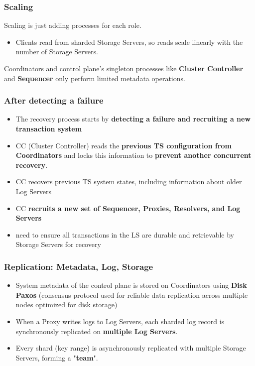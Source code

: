 \begin{frame}
	\frametitle{Scaling}
Scaling is just adding processes for each role. \\

\begin{itemize}
\item Clients read from sharded Storage Servers, so reads scale
linearly with the number of Storage Servers. 
\end{itemize}

\vspace{0.5cm}
Coordinators and control plane's singleton processes like \textbf{Cluster Controller} and \textbf{Sequencer} only perform limited metadata operations.
	
\end{frame}


\begin{frame}
	\frametitle{After detecting a failure}
    \begin{itemize}
        \item The recovery process starts by
        \textbf{detecting a failure and recruiting a new transaction system}
        \item CC (Cluster Controller) reads the \textbf{previous TS configuration from Coordinators} and locks this information
        to \textbf{prevent another concurrent recovery}.
        \item CC recovers previous TS system states, including information about older Log Servers
        \item CC \textbf{recruits a new set of Sequencer, Proxies, Resolvers,
        and Log Servers}
        \item need to ensure all transactions in the LS are durable and retrievable by Storage Servers for recovery

    \end{itemize}

\end{frame}

\begin{frame}
	\frametitle{Replication: Metadata, Log, Storage}
    \begin{itemize}
      \item System metadata of the control plane is stored on Coordinators using \textbf{Disk Paxos} (consensus protocol used for reliable data replication across multiple nodes optimized for disk storage)
      \item When a Proxy writes logs to Log Servers, each sharded log record is synchronously replicated on \textbf{multiple Log Servers}.
      \item Every shard (key range) is asynchronously replicated with multiple Storage Servers, forming a "\textbf{team}".

\end{itemize}
\end{frame}

